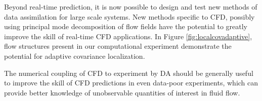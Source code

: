 Beyond real-time prediction, it is now possible to design and test new methods of data assimilation for large scale systems.
New methods specific to CFD, possibly using principal mode decomposition of flow fields have the potential to greatly improve the skill of real-time CFD applications.
In Figure \ref{fig:localcovadaptive}, flow structures present in our computational experiment demonstrate the potential for adaptive covariance localization.

The numerical coupling of CFD to experiment by DA should be generally useful to improve the skill of CFD predictions in even data-poor experiments, which can provide better knowledge of unobservable quantities of interest in fluid flow.



